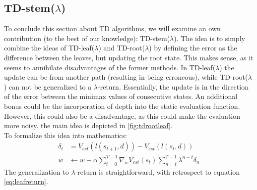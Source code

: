 \subsection{TD-stem($\lambda$)}
\label{subsec:tdrootleaf}
To conclude this section about TD algorithms, we will examine an own contribution (to the best of our knowledge): TD-stem($\lambda$). The idea is to simply combine the ideas of TD-leaf($\lambda$) and TD-root($\lambda$) by defining the error as the difference between the leaves, but updating the root state. This makes sense, as it seems to annihilate disadvantages of the former methods. In TD-leaf($\lambda$) the update can be from another path (resulting in being erroneous), while TD-root($\lambda$) can not be generalized to a $\lambda$-return. Essentially, the update is in the direction of the error between the minimax values of consecutive states. An additional bonus could be the incorporation of depth into the static evaluation function. However, this could also be a disadvantage, as this could make the evaluation more noisy. the main idea is depicted in \ref{fig:tdrootleaf}. \\
To formalize this idea into mathematics:
\begin{align}
\delta_t&=V_{est}\left(l(s_{t+1},d)\right)-V_{est}(l(s_{t},d))\\
w &\leftarrow w-\alpha \sum_{t=0}^{T-1} \nabla_w V_{est}(s_t) \sum_{n=t}^{T-1} \lambda^{n-t}\delta_n
\end{align}
The generalization to $\lambda$-return is straightforward, with retrospect to equation \ref{eq:leafreturn}.

